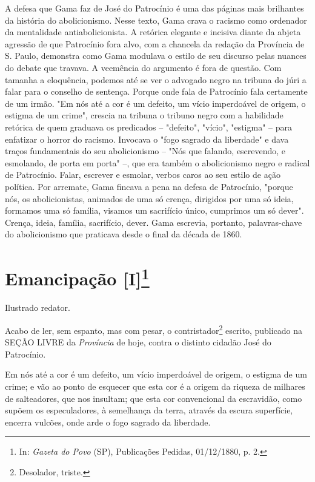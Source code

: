 \pagebreak
\mbox{}\vfill
\thispagestyle{empty}

{\small\noindent
A defesa que Gama faz de José do Patrocínio é uma das páginas mais
brilhantes da história do abolicionismo. Nesse texto, Gama crava o
racismo como ordenador da mentalidade antiabolicionista. A retórica
elegante e incisiva diante da abjeta agressão de que Patrocínio fora
alvo, com a chancela da redação da Província de S. Paulo, demonstra como
Gama modulava o estilo de seu discurso pelas nuances do debate que
travava. A veemência do argumento é fora de questão. Com tamanha a
eloquência, podemos até se ver o advogado negro na tribuna do júri a
falar para o conselho de sentença. Porque onde fala de Patrocínio fala
certamente de um irmão. "Em nós até a cor é um defeito, um vício
imperdoável de origem, o estigma de um crime", crescia na tribuna o
tribuno negro com a habilidade retórica de quem graduava os predicados
-- "defeito", "vício", "estigma" -- para enfatizar o horror do racismo.
Invocava o "fogo sagrado da liberdade" e dava traços fundamentais do seu
abolicionismo -- "Nós que falando, escrevendo, e esmolando, de porta em
porta" --, que era também o abolicionismo negro e radical de Patrocínio.
Falar, escrever e esmolar, verbos caros ao seu estilo de ação política.
Por arremate, Gama fincava a pena na defesa de Patrocínio, "porque nós,
os abolicionistas, animados de uma só crença, dirigidos por uma só
ideia, formamos uma só família, visamos um sacrifício único, cumprimos
um só dever". Crença, ideia, família, sacrifício, dever. Gama escrevia,
portanto, palavras-chave do abolicionismo que praticava desde o final da
década de 1860. }

\chapter{Emancipação {[}I{]}\footnote[*]{In: \emph{Gazeta do Povo}
  (SP), Publicações Pedidas, 01/12/1880, p. 2.}}


Ilustrado redator.

Acabo de ler, sem espanto, mas com pesar, o contristador\footnote{
  Desolador, triste.} escrito, publicado na SEÇÃO LIVRE da
\emph{Província} de hoje, contra o distinto cidadão José do Patrocínio.

Em nós até a cor é um defeito, um vício imperdoável de origem, o estigma
de um crime; e vão ao ponto de esquecer que esta cor é a origem da
riqueza de milhares de salteadores, que nos insultam; que esta cor
convencional da escravidão, como supõem os especuladores, à semelhança
da terra, através da escura superfície, encerra vulcões, onde arde o
fogo sagrado da liberdade.

